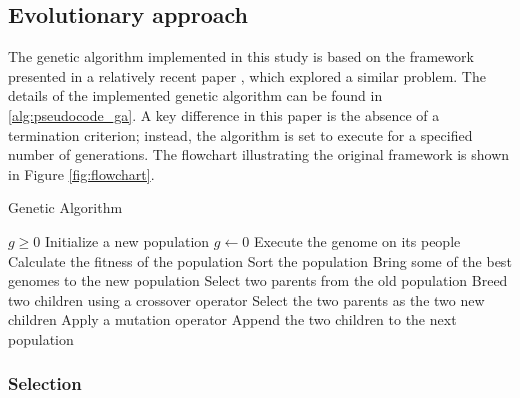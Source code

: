 

\subsection{Evolutionary approach}

The genetic algorithm implemented in this study is based on the framework presented in a relatively recent paper \cite{tartan2016flow}, which explored a similar problem. The details of the implemented genetic algorithm can be found in \ref{alg:pseudocode_ga}. A key difference in this paper is the absence of a termination criterion; instead, the algorithm is set to execute for a specified number of generations. The flowchart illustrating the original framework is shown in Figure \ref{fig:flowchart}.

\begin{algorithm}
	\caption{Genetic Algorithm}\label{alg:pseudocode_ga}
	\begin{algorithmic}
		\Require $g \geq 0$
		\State Initialize a new population
		\State $g \gets 0$
		\State Execute the genome on its people
		\EndFor
		\State Calculate the fitness of the population
		\State Sort the population
		 
		\State Bring some of the best genomes to the new population
		\EndIf
		\State Select two parents from the old population
		\State Breed two children using a crossover operator
		\Else
		\State Select the two parents as the two new children
		\EndIf
		\State Apply a mutation operator
		\EndIf
		\EndFor
		\State Append the two children to the next population
		\EndWhile
		\EndWhile
	\end{algorithmic}
\end{algorithm}

\subsubsection{Selection}

